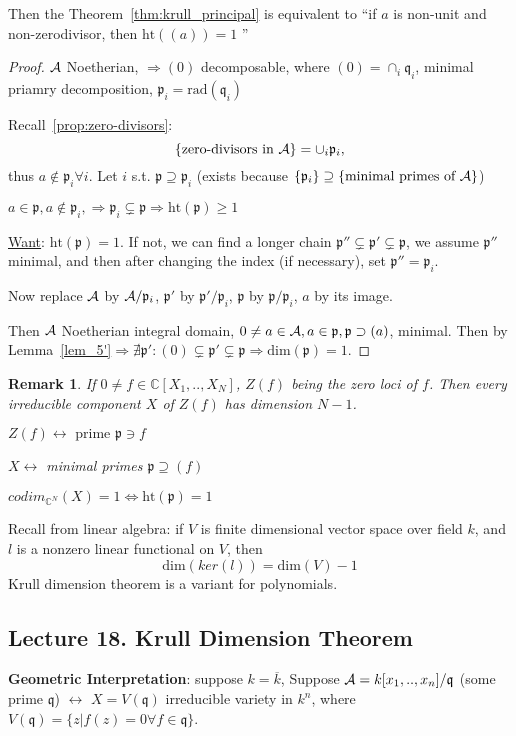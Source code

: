 \documentclass[11pt]{article}
\newtheorem{rmk}[thm]{Remark}
\newcommand{\cplx}{\mathbb C}
\newcommand{\scp}{{\mathfrak p}}
\newcommand{\scq}{\mathfrak q}
\newcommand{\cala}{{\cal A}}
\newcommand{\Lrta}{\Longrightarrow}
\newcommand{\llrta}{\longleftrightarrow}
\newcommand{\Llrta}{\Longleftrightarrow}
\begin{document}
Then the Theorem~\ref{thm:krull_principal} is equivalent to 
``if $a$ is non-unit and non-zerodivisor, then $\text{ht}((a))=1$ ''
\begin{proof}
$\cala$ Noetherian, $\Lrta (0)$ decomposable, where $(0)=\cap_i\scq_i$, minimal priamry decomposition, $\scp_i=\text{rad}(\scq_i)$

Recall~\ref{prop:zero-divisors}:
$$
\{\text{zero-divisors in }\cala\} =\cup_i\scp_i,
$$
thus $a\notin\scp_i\forall i$. Let $i$ s.t. $\scp\supseteq \scp_i$ (exists because $\{\scp_i\}\supseteq \{\text{minimal primes of $\cala$}\}$)

$a\in\scp ,a\notin \scp_i,\Lrta\scp_i\subsetneq \scp\Lrta \text{ht}(\scp)\geq 1$

\underline{Want}: $\text{ht}(\scp)=1$. If not, we can find a longer chain $\scp''\subsetneq \scp'\subsetneq \scp$, we assume $\scp''$ minimal, and then after changing the index (if necessary), set $\scp''=\scp_i$.

Now replace
$\cala$ by $\cala/\scp_i$, $\scp'$ by $\scp'/\scp_i$, $\scp$ by $\scp/\scp_i$, $a$ by its image.

Then $\cala$ Noetherian integral domain, $0\neq a\in \cala,a\in\scp,\scp\supset(a)$, minimal.
Then by Lemma~\ref{lem_5'}$\Lrta \nexists \scp':(0)\subsetneq \scp'\subsetneq \scp\Lrta \text{dim}(\scp)=1$.
\end{proof}

\begin{rmk}
If $0\neq f\in\cplx[X_1,..,X_N]$, $Z(f)$ being the zero loci of $f$. Then every irreducible component $X$ of $Z(f)$ has dimension $N-1$.

$Z(f)\llrta\text{ prime }\scp\ni f$

$X\llrta $ minimal primes $\scp\supseteq (f)$ 

$codim_{\cplx^N}(X)=1\Llrta \text{ht}(\scp)=1$
\end{rmk}

Recall from linear algebra:
if $V$ is finite dimensional vector space over field $k$, and $l$ is a nonzero linear functional on $V$, then
$$
\text{dim}(ker(l))=\text{dim}(V)-1
$$
Krull dimension theorem is a variant for polynomials.



\subsection{Lecture 18. Krull Dimension Theorem}

\textbf{Geometric Interpretation}: suppose $k=\overline{k}$,
Suppose $\cala=k[x_1,..,x_n]/\scq$ (some prime $\scq$) $\llrta$ $X=V(\scq)$ irreducible variety in $k^n$, where $V(\scq)=\{z|f(z)=0\forall f\in\scq\}$.
\end{document}
